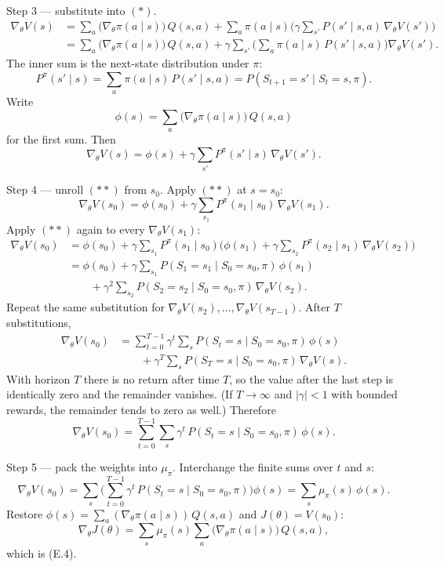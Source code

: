 Step 3 --- substitute into $(*)$. \[
\begin{aligned}
\nabla_\theta V(s)
&=
\sum_a\bigl(\nabla_\theta\pi(a\mid s)\bigr)\,Q(s,a)
+
\sum_a\pi(a\mid s)\Biggl(
\gamma\sum_{s'}P(s'\mid s,a)\,\nabla_\theta V(s')
\Biggr)
\\
&=
\sum_a\bigl(\nabla_\theta\pi(a\mid s)\bigr)\,Q(s,a)
+
\gamma\sum_{s'}
\Biggl(
\sum_a\pi(a\mid s)\,P(s'\mid s,a)
\Biggr)
\nabla_\theta V(s').
\end{aligned}
\] The inner sum is the next-state distribution under $\pi$: \[
P^\pi(s'\mid s)
=
\sum_a\pi(a\mid s)\,P(s'\mid s,a)
=
P(S_{t+1}=s'\mid S_t=s,\pi).
\] Write \[
\phi(s)
=
\sum_a\bigl(\nabla_\theta\pi(a\mid s)\bigr)\,Q(s,a)
\] for the first sum. Then \begin{equation}
\nabla_\theta V(s)
=
\phi(s)
+
\gamma\sum_{s'}P^\pi(s'\mid s)\,\nabla_\theta V(s').
\tag{**}
\end{equation}

Step 4 --- unroll $(**)$ from $s_0$. Apply $(**)$ at $s=s_0$: \[
\nabla_\theta V(s_0)
=
\phi(s_0)
+
\gamma\sum_{s_1}P^\pi(s_1\mid s_0)\,\nabla_\theta V(s_1).
\] Apply $(**)$ again to every $\nabla_\theta V(s_1)$: \[
\begin{aligned}
\nabla_\theta V(s_0)
&=
\phi(s_0)
+
\gamma\sum_{s_1}P^\pi(s_1\mid s_0)
\Biggl(
\phi(s_1)
+
\gamma\sum_{s_2}P^\pi(s_2\mid s_1)\,\nabla_\theta V(s_2)
\Biggr)
\\
&=
\phi(s_0)
+
\gamma\sum_{s_1}P(S_1=s_1\mid S_0=s_0,\pi)\,\phi(s_1)
\\
&\qquad
+
\gamma^2\sum_{s_2}P(S_2=s_2\mid S_0=s_0,\pi)\,\nabla_\theta V(s_2).
\end{aligned}
\] Repeat the same substitution for $\nabla_\theta V(s_2),\ldots,\nabla_\theta V(s_{T-1})$. After $T$ substitutions, \[
\begin{aligned}
\nabla_\theta V(s_0)
&=
\sum_{t=0}^{T-1}
\gamma^t
\sum_s
P(S_t=s\mid S_0=s_0,\pi)\,\phi(s)
\\
&\qquad
+
\gamma^T
\sum_s
P(S_T=s\mid S_0=s_0,\pi)\,\nabla_\theta V(s).
\end{aligned}
\] With horizon $T$ there is no return after time $T$, so the value after the last step is identically zero and the remainder vanishes. (If $T\to\infty$ and $\lvert\gamma\rvert<1$ with bounded rewards, the remainder tends to zero as well.) Therefore \[
\nabla_\theta V(s_0)
=
\sum_{t=0}^{T-1}
\sum_s
\gamma^t\,P(S_t=s\mid S_0=s_0,\pi)\,\phi(s).
\]

Step 5 --- pack the weights into $\mu_\pi$. Interchange the finite sums over $t$ and $s$: \[
\nabla_\theta V(s_0)
=
\sum_s
\Biggl(
\sum_{t=0}^{T-1}
\gamma^t\,P(S_t=s\mid S_0=s_0,\pi)
\Biggr)
\phi(s)
=
\sum_s\mu_\pi(s)\,\phi(s).
\] Restore $\phi(s)=\sum_a(\nabla_\theta\pi(a\mid s))\,Q(s,a)$ and $J(\theta)=V(s_0)$: \[
\nabla_\theta J(\theta)
=
\sum_s\mu_\pi(s)
\sum_a\bigl(\nabla_\theta\pi(a\mid s)\bigr)\,Q(s,a),
\] which is (E.4).

